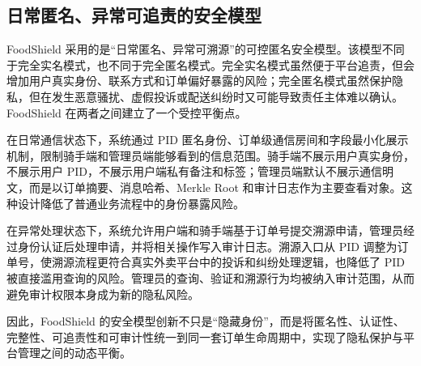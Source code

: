 \subsection{日常匿名、异常可追责的安全模型}

FoodShield 采用的是“日常匿名、异常可溯源”的可控匿名安全模型。该模型不同于完全实名模式，也不同于完全匿名模式。完全实名模式虽然便于平台追责，但会增加用户真实身份、联系方式和订单偏好暴露的风险；完全匿名模式虽然保护隐私，但在发生恶意骚扰、虚假投诉或配送纠纷时又可能导致责任主体难以确认。FoodShield 在两者之间建立了一个受控平衡点。

在日常通信状态下，系统通过 PID 匿名身份、订单级通信房间和字段最小化展示机制，限制骑手端和管理员端能够看到的信息范围。骑手端不展示用户真实身份，不展示用户 PID，不展示用户端私有备注和标签；管理员端默认不展示通信明文，而是以订单摘要、消息哈希、Merkle Root 和审计日志作为主要查看对象。这种设计降低了普通业务流程中的身份暴露风险。

在异常处理状态下，系统允许用户端和骑手端基于订单号提交溯源申请，管理员经过身份认证后处理申请，并将相关操作写入审计日志。溯源入口从 PID 调整为订单号，使溯源流程更符合真实外卖平台中的投诉和纠纷处理逻辑，也降低了 PID 被直接滥用查询的风险。管理员的查询、验证和溯源行为均被纳入审计范围，从而避免审计权限本身成为新的隐私风险。

因此，FoodShield 的安全模型创新不只是“隐藏身份”，而是将匿名性、认证性、完整性、可追责性和可审计性统一到同一套订单生命周期中，实现了隐私保护与平台管理之间的动态平衡。
